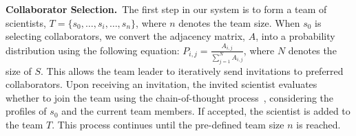 \documentclass[11pt]{article}
\begin{document}
\noindent \textbf{Collaborator Selection.}~The first step in our system is to form a team of scientists, $T = \{s_{0}, \dots, s_{i}, \dots, s_{n}\}$, where $n$ denotes the team size. When $s_{0}$ is selecting collaborators, we convert the adjacency matrix, $A$, into a probability distribution using the following equation: $P_{i,j} = \frac{A_{i,j}}{\sum_{j=1}^{N} A_{i, j}}$, where $N$ denotes the size of $S$. This allows the team leader to iteratively send invitations to preferred collaborators. Upon receiving an invitation, the invited scientist evaluates whether to join the team using the chain-of-thought process~\citep{wei2022chain}, considering the profiles of $s_0$ and the current team members. If accepted, the scientist is added to the team $T$. This process continues until the pre-defined team size $n$ is reached.
\end{document}
